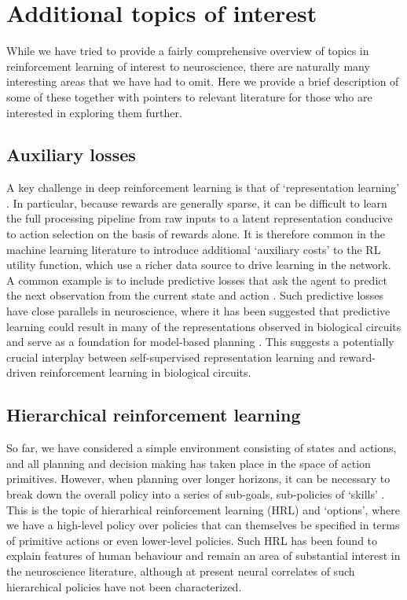 \section{Additional topics of interest}
\label{sec:additional}

While we have tried to provide a fairly comprehensive overview of topics in reinforcement learning of interest to neuroscience, there are naturally many interesting areas that we have had to omit.
Here we provide a brief description of some of these together with pointers to relevant literature for those who are interested in exploring them further.

\subsection*{Auxiliary losses}
A key challenge in deep reinforcement learning is that of `representation learning' \citep{botvinick2020deep}.
In particular, because rewards are generally sparse, it can be difficult to learn the full processing pipeline from raw inputs to a latent representation conducive to action selection on the basis of rewards alone.
It is therefore common in the machine learning literature to introduce additional `auxiliary costs' to the RL utility function, which use a richer data source to drive learning in the network.
A common example is to include predictive losses that ask the agent to predict the next observation from the current state and action \citep{jaderberg2016reinforcement, zintgraf2019varibad}.
Such predictive losses have close parallels in neuroscience, where it has been suggested that predictive learning could result in many of the representations observed in biological circuits \citep{rao1999predictive, stachenfeld2017hippocampus, whittington2020tolman, blanco2021dopamine} and serve as a foundation for model-based planning \citep{jensen2023recurrent}.
This suggests a potentially crucial interplay between self-supervised representation learning and reward-driven reinforcement learning in biological circuits.

\subsection*{Hierarchical reinforcement learning}
So far, we have considered a simple environment consisting of states and actions, and all planning and decision making has taken place in the space of action primitives.
However, when planning over longer horizons, it can be necessary to break down the overall policy into a series of sub-goals, sub-policies of `skills' \citep{sutton1999between, pateria2021hierarchical}.
This is the topic of hierarhical reinforcement learning (HRL) and `options', where we have a high-level policy over policies that can themselves be specified in terms of primitive actions or even lower-level policies.
Such HRL has been found to explain features of human behaviour \citep{eckstein2020computational} and remain an area of substantial interest in the neuroscience literature, although at present neural correlates of such hierarchical policies have not been characterized.

